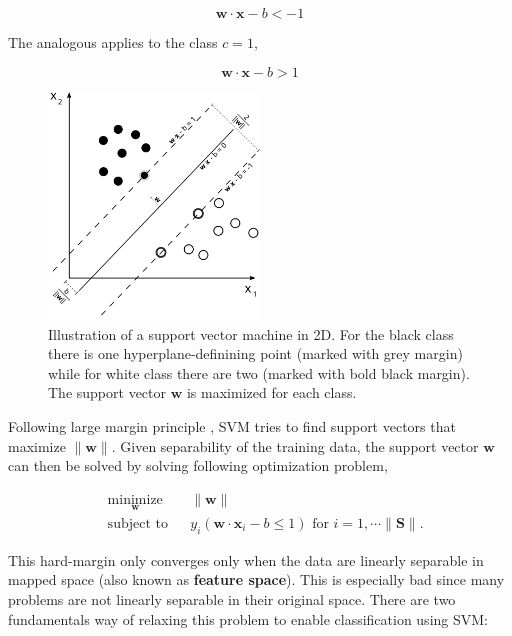 \documentclass[pdftex,12pt,a4paper]{report}
\begin{document}
\begin{equation}
\mathbf{w} \cdot \mathbf{x} - b < -1
\label{equation:svm_class_1}
\end{equation}

The analogous applies to the class $c = 1$,

\begin{equation}
\mathbf{w} \cdot \mathbf{x} - b > 1
\label{equation:svm_class_2}
\end{equation}

\begin{figure}[H]
\centering
\includegraphics[width=0.5\textwidth]{images/svm}
\caption[Illustration of SVM in 2D]{Illustration of a support vector machine in 2D. For the black class there is one hyperplane-definining point (marked with grey margin) while for white class there are two (marked with bold black margin). The support vector $\mathbf{w}$ is maximized for each class.}
\label{fig:svm}
\end{figure}

Following large margin principle \cite{vapnik1964note, murphy2012machine}, SVM tries to find support vectors that maximize $\| \mathbf{w} \|$. Given separability of the training data, the support vector $\mathbf{w}$ can then be solved by solving following optimization problem, 

\begin{equation*}
\begin{aligned}
& \underset{\mathbf{
w}}{\text{minimize}}
& & \| \mathbf{w}\| \\
& \text{subject to}
& & y_i(\mathbf{w} \cdot \mathbf{x}_i - b \leq 1) \text{ for } i = 1, \cdots \| \mathbf{S} \|.
\end{aligned}
\label{eq:svm_hard_margin}
\end{equation*}

This hard-margin only converges only when the data are linearly separable in mapped space (also known as \textbf{feature space}). This is especially bad since many problems are not linearly separable in their original space. There are two fundamentals way of relaxing this problem to enable classification using SVM:
\end{document}
